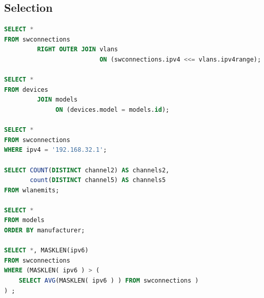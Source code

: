 \documentclass[a4paper,10pt]{article}
\begin{document}
\subsection{Selection}
\begin{lstlisting}[language=SQL]
SELECT *
FROM swconnections
         RIGHT OUTER JOIN vlans
                          ON (swconnections.ipv4 <<= vlans.ipv4range);

SELECT *
FROM devices
         JOIN models
              ON (devices.model = models.id);

SELECT *
FROM swconnections
WHERE ipv4 = '192.168.32.1';

SELECT COUNT(DISTINCT channel2) AS channels2,
       count(DISTINCT channel5) AS channels5
FROM wlanemits;

SELECT *
FROM models
ORDER BY manufacturer;

SELECT *, MASKLEN(ipv6)
FROM swconnections
WHERE (MASKLEN( ipv6 ) > (
    SELECT AVG(MASKLEN( ipv6 ) ) FROM swconnections )
) ;
\end{lstlisting}
\end{document}
